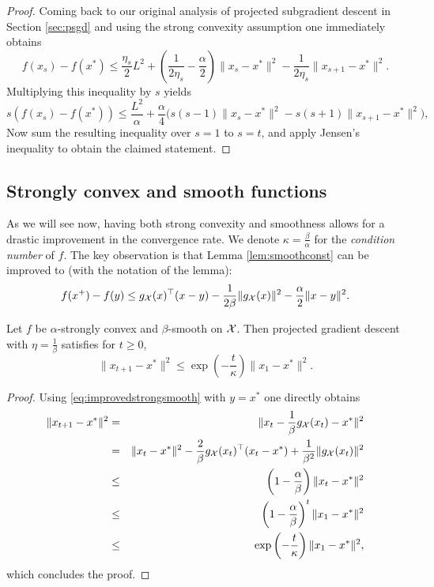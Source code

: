 \begin{proof}
Coming back to our original analysis of projected subgradient descent in Section \ref{sec:psgd} and using the strong convexity assumption one immediately obtains
$$f(x_s) - f(x^*) \leq \frac{\eta_s}{2} L^2 + \left( \frac{1}{2 \eta_s} - \frac{\alpha}{2} \right) \|x_s - x^*\|^2 - \frac{1}{2 \eta_s} \|x_{s+1} - x^*\|^2 .$$
Multiplying this inequality by $s$ yields
$$s( f(x_s) - f(x^*) ) \leq \frac{L^2}{\alpha} + \frac{\alpha}{4} \bigg( s(s-1) \|x_s - x^*\|^2 - s (s+1) \|x_{s+1} - x^*\|^2 \bigg),$$
Now sum the resulting inequality over $s=1$ to $s=t$, and apply Jensen's inequality to obtain the claimed statement.
\end{proof}

\subsection{Strongly convex and smooth functions}
As we will see now, having both strong convexity and smoothness allows for a drastic improvement in the convergence rate. We denote $\kappa= \frac{\beta}{\alpha}$ for the {\em condition number} of $f$. The key observation is that Lemma \ref{lem:smoothconst} can be improved to (with the notation of the lemma):
\begin{equation} \label{eq:improvedstrongsmooth}
f(x^+) - f(y) \leq g_{\mathcal{X}}(x)^{\top}(x-y) - \frac{1}{2 \beta} \|g_{\mathcal{X}}(x)\|^2 - \frac{\alpha}{2} \|x-y\|^2 .
\end{equation}

\begin{theorem} \label{th:gdssc}
Let $f$ be $\alpha$-strongly convex and $\beta$-smooth on $\mathcal{X}$. Then projected gradient descent with $\eta = \frac{1}{\beta}$ satisfies for $t \geq 0$,
$$\|x_{t+1} - x^*\|^2 \leq \exp\left( - \frac{t}{\kappa} \right) \|x_1 - x^*\|^2 .$$
\end{theorem}

\begin{proof}
Using \eqref{eq:improvedstrongsmooth} with $y=x^*$ one directly obtains
\begin{eqnarray*}
\|x_{t+1} - x^*\|^2& = & \|x_{t} - \frac{1}{\beta} g_{\mathcal{X}}(x_t) - x^*\|^2 \\
& = & \|x_{t} - x^*\|^2 - \frac{2}{\beta} g_{\mathcal{X}}(x_t)^{\top} (x_t - x^*) + \frac{1}{\beta^2} \|g_{\mathcal{X}}(x_t)\|^2 \\
& \leq & \left(1 - \frac{\alpha}{\beta} \right) \|x_{t} - x^*\|^2 \\
& \leq & \left(1 - \frac{\alpha}{\beta} \right)^t \|x_{1} - x^*\|^2 \\
& \leq & \exp\left( - \frac{t}{\kappa} \right) \|x_1 - x^*\|^2 ,
\end{eqnarray*}
which concludes the proof.
\end{proof}

